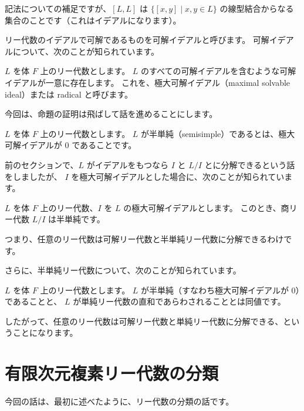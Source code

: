 \documentclass{ltjsarticle}
\begin{document}
記法についての補足ですが、\([L, L]\) は \( \{ [x, y] \mid x, y \in L \} \) の線型結合からなる集合のことです（これはイデアルになります）。

リー代数のイデアルで可解であるものを可解イデアルと呼びます。
可解イデアルについて、次のことが知られています。

\begin{usmproposition}[極大可解イデアル]
    \(L\) を体 \(F\) 上のリー代数とします。
    \(L\) のすべての可解イデアルを含むような可解イデアルが一意に存在します。
    これを、極大可解イデアル（maximal solvable ideal）または radical と呼びます。
\end{usmproposition}

今回は、命題の証明は飛ばして話を進めることにします。

\begin{usmdefinition}[半単純]
    \(L\) を体 \(F\) 上のリー代数とします。
    \(L\) が半単純（semisimple）であるとは、極大可解イデアルが \(0\) であることです。
\end{usmdefinition}

前のセクションで、\(L\) がイデアルをもつなら \(I\) と \(L/I\) とに分解できるという話をしましたが、
\(I\) を極大可解イデアルとした場合に、次のことが知られています。

\begin{usmproposition}[極大可解イデアルによる商]
    \(L\) を体 \(F\) 上のリー代数、\(I\) を \(L\) の極大可解イデアルとします。
    このとき、商リー代数 \(L/I\) は半単純です。
\end{usmproposition}

つまり、任意のリー代数は可解リー代数と半単純リー代数に分解できるわけです。

さらに、半単純リー代数について、次のことが知られています。

\begin{usmproposition}[単純と半単純]
    \(L\) を体 \(F\) 上のリー代数とします。
    \(L\) が半単純（すなわち極大可解イデアルが \(0\)）であることと、
    \(L\) が単純リー代数の直和であらわされることとは同値です。
\end{usmproposition}

したがって、任意のリー代数は可解リー代数と単純リー代数に分解できる、ということになります。

\section{有限次元複素リー代数の分類}

今回の話は、最初に述べたように、リー代数の分類の話です。
\end{document}
